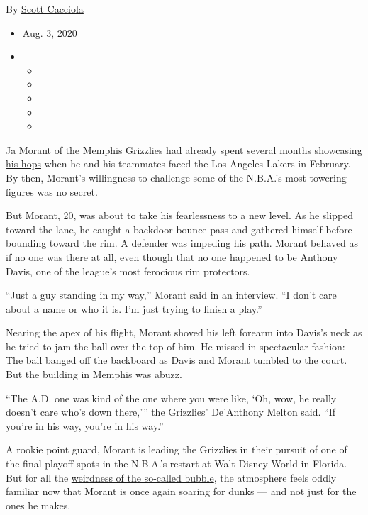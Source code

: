 By \href{https://www.nytimes3xbfgragh.onion/by/scott-cacciola}{Scott
Cacciola}

\begin{itemize}
\item
  Aug. 3, 2020
\item
  \begin{itemize}
  \item
  \item
  \item
  \item
  \item
  \end{itemize}
\end{itemize}

Ja Morant of the Memphis Grizzlies had already spent several months
\href{https://www.nytimes3xbfgragh.onion/2019/11/02/sports/basketball/ja-morant-memphis-grizzlies.html}{showcasing
his hops} when he and his teammates faced the Los Angeles Lakers in
February. By then, Morant's willingness to challenge some of the
N.B.A.'s most towering figures was no secret.

But Morant, 20, was about to take his fearlessness to a new level. As he
slipped toward the lane, he caught a backdoor bounce pass and gathered
himself before bounding toward the rim. A defender was impeding his
path. Morant \href{https://www.youtube.com/watch?v=de0nkHhxGKI}{behaved
as if no one was there at all}, even though that no one happened to be
Anthony Davis, one of the league's most ferocious rim protectors.

``Just a guy standing in my way,'' Morant said in an interview. ``I
don't care about a name or who it is. I'm just trying to finish a
play.''

Nearing the apex of his flight, Morant shoved his left forearm into
Davis's neck as he tried to jam the ball over the top of him. He missed
in spectacular fashion: The ball banged off the backboard as Davis and
Morant tumbled to the court. But the building in Memphis was abuzz.

``The A.D. one was kind of the one where you were like, `Oh, wow, he
really doesn't care who's down there,''' the Grizzlies' De'Anthony
Melton said. ``If you're in his way, you're in his way.''

A rookie point guard, Morant is leading the Grizzlies in their pursuit
of one of the final playoff spots in the N.B.A.'s restart at Walt Disney
World in Florida. But for all the
\href{https://www.nytimes3xbfgragh.onion/2020/07/27/sports/basketball/coronavirus-nba-season-bubble-disney-world.html}{weirdness
of the so-called bubble}, the atmosphere feels oddly familiar now that
Morant is once again soaring for dunks --- and not just for the ones he
makes.

